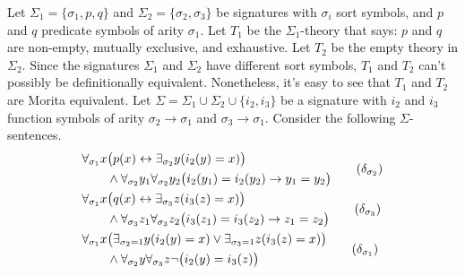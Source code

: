 \begin{example}
  Let $\Sigma _1 =\{ \sigma _1,p,q\}$ and $\Sigma _2=\{ \sigma
  _2,\sigma _3 \}$ be signatures with $\sigma _i$ sort symbols, and
  $p$ and $q$ predicate symbols of arity $\sigma _1$.  Let $T_1$ be
  the $\Sigma_1$-theory that says: $p$ and $q$ are non-empty, mutually
  exclusive, and exhaustive.  Let $T_2$ be the empty theory in $\Sigma
  _2$.  Since the signatures $\Sigma _1$ and $\Sigma _2$ have
  different sort symbols, $T_1$ and $T_2$ can't possibly be
  definitionally equivalent.  Nonetheless, it's easy to see that $T_1$
  and $T_2$ are Morita equivalent. Let
  $\Sigma=\Sigma_1\cup\Sigma_2\cup\{i_2, i_3\}$ be a signature with
  $i_2$ and $i_3$ function symbols of arity
  $\sigma_2\rightarrow\sigma_1$ and
  $\sigma_3\rightarrow\sigma_1$. Consider the following
  $\Sigma$-sentences.
\begin{align*}
%
&\begin{aligned}
&\forall_{\sigma_1}x\big(p(x)\leftrightarrow\exists_{\sigma_2} y(i_2(y)=x)\big)\\
&\qquad\land\forall_{\sigma_2} y_1\forall_{\sigma_2} y_2\big(i_2(y_1)=i_2(y_2)\rightarrow y_1=y_2\big)\\
\end{aligned}
\tag{$\delta_{\sigma_2}$}\\
%
&\begin{aligned}
&\forall_{\sigma_1}x\big(q(x)\leftrightarrow\exists_{\sigma_3} z(i_3(z)=x)\big)\\
&\qquad\land\forall_{\sigma_3} z_1\forall_{\sigma_3} z_2\big(i_3(z_1)=i_3(z_2)\rightarrow z_1=z_2\big)\\
\end{aligned}
\tag{$\delta_{\sigma_3}$}\\
%
%
%
&\begin{aligned}
&\forall_{\sigma_1} x\big(\exists_{\sigma_2=1}y(i_2(y)=x)\lor\exists_{\sigma_3=1} z(i_3(z)=x)\big)\\
&\qquad\land \forall_{\sigma_2} y\forall_{\sigma_3} z \lnot\big(i_2(y)=i_3(z)\big)\\
\end{aligned}
\tag{$\delta_{\sigma_1}$}\\
%
&\begin{aligned}

\end{aligned}
\end{align*}
\end{example}
